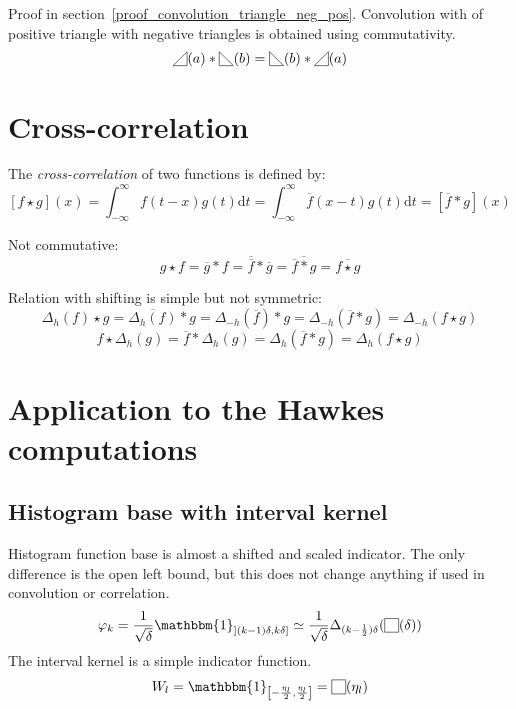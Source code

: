\documentclass[a4paper,10pt]{article}
\newcommand\Shifted[2]{\Delta_{#1}(#2)}
\newcommand\Reversed[1]{\overline{#1}} %
\newcommand\SymSquare{\begin{tikzpicture}[baseline=0.5ex]%
        \draw (0,0) -- (0,1em) -- (1em,1em) -- (1em,0) -- cycle;
\end{tikzpicture}}
\newcommand\Indicator[1]{\SymSquare(#1)}
\newcommand\SymPositiveTriangle{\begin{tikzpicture}[baseline=0.5ex]%
        \draw (0,0) -- (1em,0em) -- (1em,1em) -- cycle;
\end{tikzpicture}}
\newcommand\PositiveTriangle[1]{\SymPositiveTriangle(#1)}
\newcommand\SymNegativeTriangle{\begin{tikzpicture}[baseline=0.5ex]%
        \draw (0,0) -- (0,1em) -- (1em,0em) -- cycle;
\end{tikzpicture}}
\newcommand\NegativeTriangle[1]{\SymNegativeTriangle(#1)}
\newcommand\D{\mathrm{d}}
\newcommand\Convolution{\ast}
\newcommand\Correlation{\star}
\newcommand\IntR[2]{\int_{-\infty}^{\infty}#1 \D#2}
\begin{document}
Proof in section~\ref{proof_convolution_triangle_neg_pos}.
Convolution with of positive triangle with negative triangles is obtained using commutativity.
\[ \PositiveTriangle{a} \Convolution \NegativeTriangle{b} = \NegativeTriangle {b} \Convolution \PositiveTriangle{a} \]

\section{Cross-correlation}
The \emph{cross-correlation} of two functions is defined by:
\[ \left[ f \Correlation g \right] (x) = \IntR{f(t-x) g(t)}{t} = \IntR{\Reversed{f}(x-t) g(t)}{t} = \left[ \Reversed{f} \Convolution g \right] (x) \]

Not commutative:
\[
    g \Correlation f = \Reversed{g} \Convolution f = \Reversed{\Reversed{f}} \Convolution \Reversed{g} =
    \Reversed{\Reversed{f} \Convolution g} = \Reversed{f \Correlation g}
\]

Relation with shifting is simple but not symmetric:
\[
    \Shifted{h}{f} \Correlation g = \Reversed{\Shifted{h}{f}} \Convolution g = \Shifted{-h}{\Reversed{f}} \Convolution g =
    \Shifted{-h}{\Reversed{f} \Convolution g} = \Shifted{-h}{f \Correlation g}
\]
\[ f \Correlation \Shifted{h}{g} = \Reversed{f} \Convolution \Shifted{h}{g} = \Shifted{h}{\Reversed{f} \Convolution g} = \Shifted{h}{f \Correlation g} \]

\section{Application to the Hawkes computations}

\subsection{Histogram base with interval kernel}
Histogram function base is almost a shifted and scaled indicator.
The only difference is the open left bound, but this does not change anything if used in convolution or correlation.
\[
    \varphi_k =
    \frac{1}{\sqrt{\delta}} \mathbbm{1}_{\left] (k-1)\delta, k\delta \right]} \simeq
    \frac{1}{\sqrt{\delta}} \Shifted{(k-\frac{1}{2})\delta}{\Indicator{\delta}}
\]
The interval kernel is a simple indicator function.
\[ W_l =  \mathbbm{1}_{\left[ -\frac{\eta_l}{2}, \frac{\eta_l}{2} \right]} = \Indicator{\eta_l} \]
\end{document}
